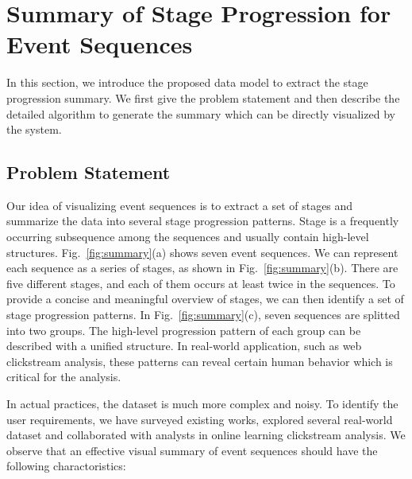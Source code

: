 
\section{Summary of Stage Progression for Event Sequences}
\label{section:algorithm}

In this section, we introduce the proposed data model to extract the stage progression summary. We first give the problem statement and then describe the detailed algorithm to generate the summary which can be directly visualized by the system. 

\subsection{Problem Statement}

Our idea of visualizing event sequences is to extract a set of stages and summarize the data into several stage progression patterns. Stage is a frequently occurring subsequence among the sequences and usually contain high-level structures. Fig.~\ref{fig:summary}(a) shows seven event sequences. We can represent each sequence as a series of stages, as shown in Fig.~\ref{fig:summary}(b). There are five different stages, and each of them occurs at least twice in the sequences. To provide a concise and meaningful overview of stages, we can then identify a set of stage progression patterns. In Fig.~\ref{fig:summary}(c), seven sequences are splitted into two groups. The high-level progression pattern of each group can be described with a unified structure. In real-world application, such as web clickstream analysis, these patterns can reveal certain human behavior which is critical for the analysis.

In actual practices, the dataset is much more complex and noisy. To identify the user requirements, we have surveyed existing works, explored several real-world dataset and collaborated with analysts in online learning clickstream analysis. We observe that an effective visual summary of event sequences should have the following charactoristics: 

